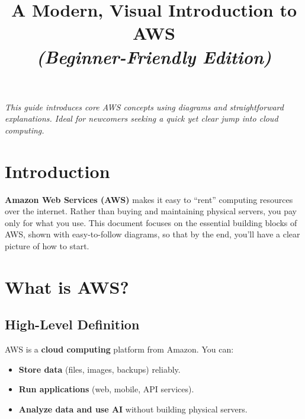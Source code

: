 \documentclass[12pt]{article}
\title{
  \vspace{-1.5cm}
  \color{mainDark}\Huge A Modern, Visual Introduction to AWS \\
  \vspace{0.1cm}
  \large \textit{(Beginner-Friendly Edition)}
}
\author{}
\date{}
\begin{document}
\maketitle

\thispagestyle{empty}
\vfill
\begin{center}
    \textit{\color{mainDark}
        This guide introduces core AWS concepts using diagrams and
        straightforward explanations. Ideal for newcomers seeking a
        quick yet clear jump into cloud computing.
    }
\end{center}
\vfill
\clearpage

\tableofcontents
\clearpage

\section*{Introduction}
\justifying

\textbf{Amazon Web Services (AWS)} makes it easy to “rent” computing resources over the internet. Rather than buying and maintaining physical servers, you pay only for what you use. This document focuses on the essential building blocks of AWS, shown with easy-to-follow diagrams, so that by the end, you’ll have a clear picture of how to start.

\clearpage

\section{What is AWS?}
\justifying

\subsection{High-Level Definition}
AWS is a \textbf{cloud computing} platform from Amazon. You can:
\begin{itemize}
    \item \textbf{Store data} (files, images, backups) reliably.
    \item \textbf{Run applications} (web, mobile, API services).
    \item \textbf{Analyze data and use AI} without building physical servers.
\end{itemize}
\end{document}
